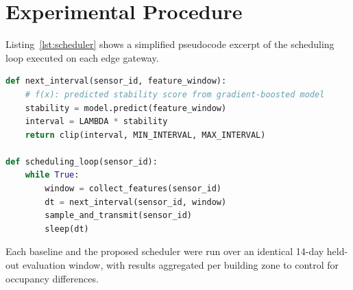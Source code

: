 \section{Experimental Procedure}

Listing~\ref{lst:scheduler} shows a simplified pseudocode excerpt of the scheduling loop executed
on each edge gateway.

\begin{lstlisting}[language=Python,caption={Simplified adaptive scheduling loop},label={lst:scheduler}]
def next_interval(sensor_id, feature_window):
    # f(x): predicted stability score from gradient-boosted model
    stability = model.predict(feature_window)
    interval = LAMBDA * stability
    return clip(interval, MIN_INTERVAL, MAX_INTERVAL)

def scheduling_loop(sensor_id):
    while True:
        window = collect_features(sensor_id)
        dt = next_interval(sensor_id, window)
        sample_and_transmit(sensor_id)
        sleep(dt)
\end{lstlisting}

Each baseline and the proposed scheduler were run over an identical 14-day held-out evaluation
window, with results aggregated per building zone to control for occupancy differences.
